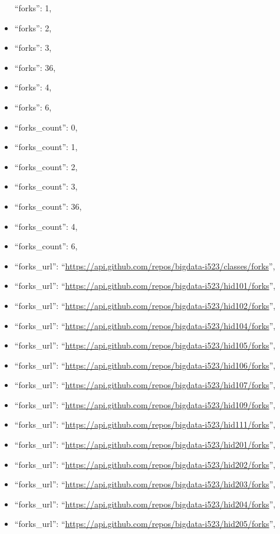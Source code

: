 \begin{itemize}
  ``forks'': 1,
\item
  ``forks'': 2,
\item
  ``forks'': 3,
\item
  ``forks'': 36,
\item
  ``forks'': 4,
\item
  ``forks'': 6,
\item
  ``forks\_count'': 0,
\item
  ``forks\_count'': 1,
\item
  ``forks\_count'': 2,
\item
  ``forks\_count'': 3,
\item
  ``forks\_count'': 36,
\item
  ``forks\_count'': 4,
\item
  ``forks\_count'': 6,
\item
  ``forks\_url'':
  ``\url{https://api.github.com/repos/bigdata-i523/classes/forks}'',
\item
  ``forks\_url'':
  ``\url{https://api.github.com/repos/bigdata-i523/hid101/forks}'',
\item
  ``forks\_url'':
  ``\url{https://api.github.com/repos/bigdata-i523/hid102/forks}'',
\item
  ``forks\_url'':
  ``\url{https://api.github.com/repos/bigdata-i523/hid104/forks}'',
\item
  ``forks\_url'':
  ``\url{https://api.github.com/repos/bigdata-i523/hid105/forks}'',
\item
  ``forks\_url'':
  ``\url{https://api.github.com/repos/bigdata-i523/hid106/forks}'',
\item
  ``forks\_url'':
  ``\url{https://api.github.com/repos/bigdata-i523/hid107/forks}'',
\item
  ``forks\_url'':
  ``\url{https://api.github.com/repos/bigdata-i523/hid109/forks}'',
\item
  ``forks\_url'':
  ``\url{https://api.github.com/repos/bigdata-i523/hid111/forks}'',
\item
  ``forks\_url'':
  ``\url{https://api.github.com/repos/bigdata-i523/hid201/forks}'',
\item
  ``forks\_url'':
  ``\url{https://api.github.com/repos/bigdata-i523/hid202/forks}'',
\item
  ``forks\_url'':
  ``\url{https://api.github.com/repos/bigdata-i523/hid203/forks}'',
\item
  ``forks\_url'':
  ``\url{https://api.github.com/repos/bigdata-i523/hid204/forks}'',
\item
  ``forks\_url'':
  ``\url{https://api.github.com/repos/bigdata-i523/hid205/forks}'',

\end{itemize}
